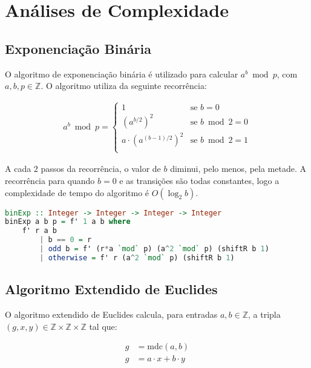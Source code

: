 \documentclass{article}
\begin{document}
\section{Análises de Complexidade}

\subsection{Exponenciação Binária}
\label{binExp}

O algoritmo de exponenciação binária é utilizado para calcular $a^b \bmod p$, com $a, b, p \in \mathbb{Z}$. O algoritmo utiliza da seguinte recorrência:

\begin{align*}
  a^b \bmod p = \begin{cases}
    1 & \text{se } b = 0 \\
    {(a^{b/2})}^2 & \text{se } b \bmod 2 = 0 \\
    a \cdot {(a^{(b-1)/2})}^2 & \text{se } b \bmod 2 = 1 \\
\end{cases}
\end{align*}

A cada 2 passos da recorrência, o valor de $b$ diminui, pelo menos, pela metade. A recorrência para quando $b = 0$ e as transições são todas constantes, logo a complexidade de tempo do algoritmo é $O(\log_2 b)$.

\begin{minipage}{.9\linewidth}
\begin{lstlisting}[language=haskell,caption=Exponenciação Binária]
binExp :: Integer -> Integer -> Integer -> Integer
binExp a b p = f' 1 a b where
    f' r a b
        | b == 0 = r
        | odd b = f' (r*a `mod` p) (a^2 `mod` p) (shiftR b 1)
        | otherwise = f' r (a^2 `mod` p) (shiftR b 1)

\end{lstlisting}
\end{minipage}

\subsection{Algoritmo Extendido de Euclides}

O algoritmo extendido de Euclides calcula, para entradas $a, b \in \mathbb{Z}$, a tripla $(g, x, y) \in \mathbb{Z} \times \mathbb{Z} \times \mathbb{Z}$ tal que:

\begin{align*}
  g & = \text{mdc}(a, b) \\
  g & = a \cdot x + b \cdot y \\
\end{align*}
\end{document}
